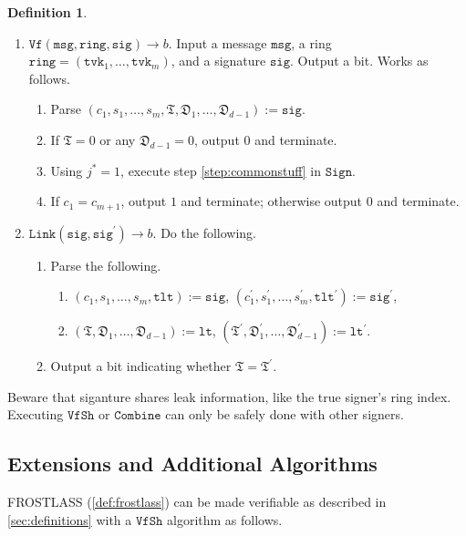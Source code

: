 \documentclass[11pt]{article}
\theoremstyle{definition}
\newtheorem{definition}[definition]{Definition}
\newcommand{\lt}{\texttt{lt}}
\newcommand{\tlt}{\texttt{tlt}}
\newcommand{\tvk}{\texttt{tvk}}
\newcommand{\ring}{\texttt{ring}}
\newcommand{\sig}{\texttt{sig}}
\newcommand{\msg}{\texttt{msg}}
\newcommand{\sign}{\texttt{Sign}}
\newcommand{\combine}{\texttt{Combine}}
\newcommand{\verify}{\texttt{Vf}}
\newcommand{\link}{\texttt{Link}}
\newcommand{\verifyshare}{\texttt{VfSh}}
\newcommand{\signaturequery}{(\texttt{dst}_{j} \mid \mid \ring \mid \mid \tlt \mid \mid \underline{\widehat{Y}} \mid \mid \mathfrak{W} \mid \mid \underline{W} \mid \mid \underline{\mu} \mid \mid L_{j} \mid \mid R_{j} \mid \mid \msg)}
\begin{document}
\begin{definition}
\begin{enumerate}
\item $\verify(\msg, \ring, \sig) \to b$. Input a message $\msg$, a ring $\ring = (\tvk_1, \ldots, \tvk_m)$, and a signature $\sig$. Output a bit. Works as follows.
\begin{enumerate}
\item Parse $(c_1, s_1, \ldots, s_m, \mathfrak{T}, \mathfrak{D}_1, \ldots, \mathfrak{D}_{d-1}) := \sig$. 
\item If $\mathfrak{T} = 0$ or any $\mathfrak{D}_{d-1} = 0$, output $0$ and terminate.
\item Using $j^* = 1$, execute step \cref{step:commonstuff} in $\sign$.
\item If $c_1 = c_{m+1}$, output $1$ and terminate; otherwise output $0$ and terminate.
\end{enumerate}


\item $\link(\sig, \sig^\prime) \to b$. Do the following.
\begin{enumerate}
\item Parse the following.
\begin{enumerate}
\item $(c_1, s_1, \ldots, s_m, \tlt) := \sig$, $(c_1^\prime, s_1^\prime, \ldots, s_m^\prime, \tlt^\prime) := \sig^\prime$,
\item $(\mathfrak{T}, \mathfrak{D}_1, \ldots, \mathfrak{D}_{d-1}) := \lt$,  $(\mathfrak{T}^\prime, \mathfrak{D}_1^\prime, \ldots, \mathfrak{D}_{d-1}^\prime) := \lt^\prime$. 
\end{enumerate}
\item Output a bit indicating whether $\mathfrak{T} = \mathfrak{T}^\prime$.%
\end{enumerate} 


\end{enumerate}
\end{definition}

Beware that siganture shares leak information, like the true signer's ring index. Executing $\verifyshare$ or $\combine$ can only be safely done with other signers.


\subsection{Extensions and Additional Algorithms}\label{sec:extensions}



FROSTLASS (\cref{def:frostlass}) can be made verifiable as described in \cref{sec:definitions} with a $\verifyshare$ algorithm as follows.
\end{document}
